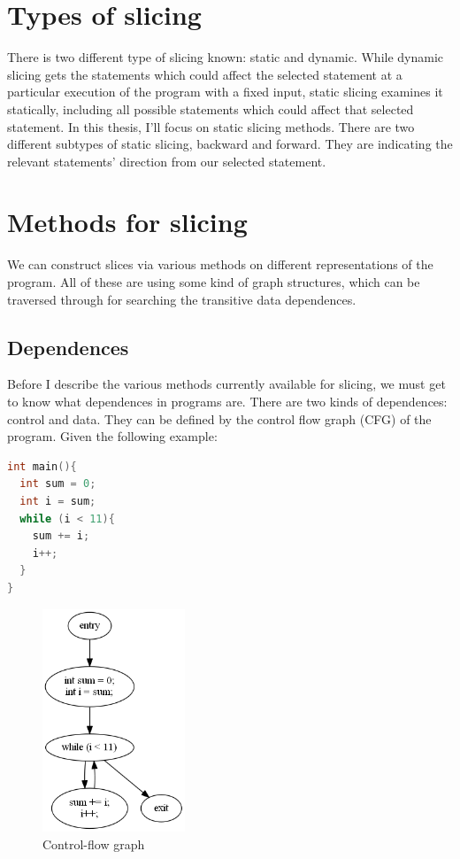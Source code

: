 \documentclass[oneside,12pt,a4paper]{book}
\begin{document}
\section{Types of slicing}
There is two different type of slicing known: static and dynamic. While dynamic slicing gets the statements which could affect the selected statement at a particular execution of the program with a fixed input, static slicing examines it statically, including all possible statements which could affect that selected statement. In this thesis, I'll focus on static slicing methods. There are two different subtypes of static slicing, backward and forward. They are indicating the relevant statements' direction from our selected statement. 

\section{Methods for slicing}
We can construct slices via various methods on different representations of the program. All of these are using some kind of graph structures, which can be traversed through for searching the transitive data dependences.

\subsection{Dependences}
Before I describe the various methods currently available for slicing, we must get to know what dependences in programs are. There are two kinds of dependences: control and data. They can be defined by the control flow graph (CFG) of the program. Given the following example:

\begin{lstlisting}[language=C++]
int main(){
  int sum = 0;
  int i = sum;
  while (i < 11){
    sum += i;
    i++;
  }
}
\end{lstlisting}

\begin{figure}
  \centering
    \includegraphics[width=0.38\textwidth]{horwitz_cfg.png}
  \caption{Control-flow graph}
  \label{fig:horwitz_cfg}
\end{figure}
\end{document}
